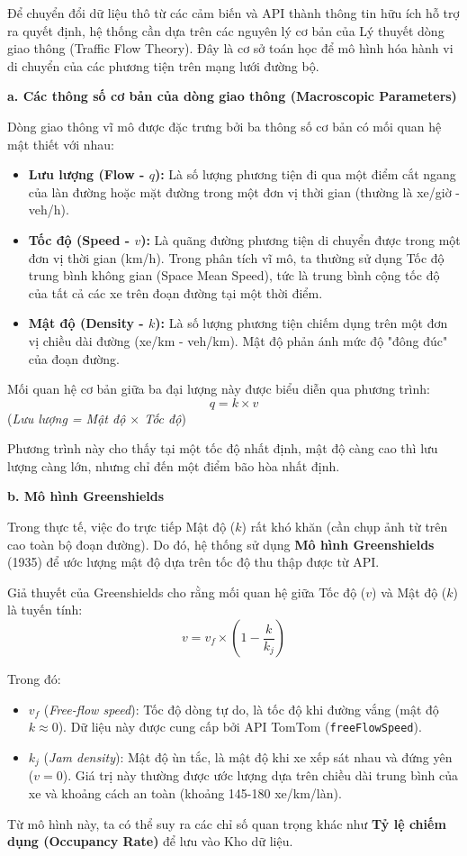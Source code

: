 Để chuyển đổi dữ liệu thô từ các cảm biến và API thành thông tin hữu ích hỗ trợ ra quyết định, hệ thống cần dựa trên các nguyên lý cơ bản của Lý thuyết dòng giao thông (Traffic Flow Theory). Đây là cơ sở toán học để mô hình hóa hành vi di chuyển của các phương tiện trên mạng lưới đường bộ.

\textbf{a. Các thông số cơ bản của dòng giao thông (Macroscopic Parameters)}

Dòng giao thông vĩ mô được đặc trưng bởi ba thông số cơ bản có mối quan hệ mật thiết với nhau:
\begin{itemize}
    \item \textbf{Lưu lượng (Flow - $q$):} Là số lượng phương tiện đi qua một điểm cắt ngang của làn đường hoặc mặt đường trong một đơn vị thời gian (thường là xe/giờ - veh/h).
    \item \textbf{Tốc độ (Speed - $v$):} Là quãng đường phương tiện di chuyển được trong một đơn vị thời gian (km/h). Trong phân tích vĩ mô, ta thường sử dụng Tốc độ trung bình không gian (Space Mean Speed), tức là trung bình cộng tốc độ của tất cả các xe trên đoạn đường tại một thời điểm.
    \item \textbf{Mật độ (Density - $k$):} Là số lượng phương tiện chiếm dụng trên một đơn vị chiều dài đường (xe/km - veh/km). Mật độ phản ánh mức độ "đông đúc" của đoạn đường.
\end{itemize}

Mối quan hệ cơ bản giữa ba đại lượng này được biểu diễn qua phương trình:
$$q = k \times v$$
(\textit{Lưu lượng = Mật độ $\times$ Tốc độ})

Phương trình này cho thấy tại một tốc độ nhất định, mật độ càng cao thì lưu lượng càng lớn, nhưng chỉ đến một điểm bão hòa nhất định.

\textbf{b. Mô hình Greenshields}

Trong thực tế, việc đo trực tiếp Mật độ ($k$) rất khó khăn (cần chụp ảnh từ trên cao toàn bộ đoạn đường). Do đó, hệ thống sử dụng \textbf{Mô hình Greenshields} (1935) để ước lượng mật độ dựa trên tốc độ thu thập được từ API.

Giả thuyết của Greenshields cho rằng mối quan hệ giữa Tốc độ ($v$) và Mật độ ($k$) là tuyến tính:
$$v = v_f \times \left(1 - \frac{k}{k_j}\right)$$

Trong đó:
\begin{itemize}
    \item $v_f$ (\textit{Free-flow speed}): Tốc độ dòng tự do, là tốc độ khi đường vắng (mật độ $k \approx 0$). Dữ liệu này được cung cấp bởi API TomTom (\texttt{freeFlowSpeed}).
    \item $k_j$ (\textit{Jam density}): Mật độ ùn tắc, là mật độ khi xe xếp sát nhau và đứng yên ($v=0$). Giá trị này thường được ước lượng dựa trên chiều dài trung bình của xe và khoảng cách an toàn (khoảng 145-180 xe/km/làn).
\end{itemize}
Từ mô hình này, ta có thể suy ra các chỉ số quan trọng khác như \textbf{Tỷ lệ chiếm dụng (Occupancy Rate)} để lưu vào Kho dữ liệu.

